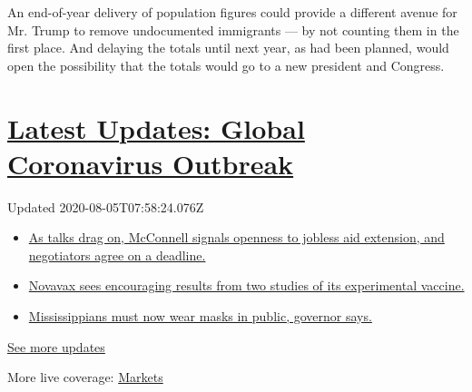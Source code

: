 An end-of-year delivery of population figures could provide a different
avenue for Mr. Trump to remove undocumented immigrants --- by not
counting them in the first place. And delaying the totals until next
year, as had been planned, would open the possibility that the totals
would go to a new president and Congress.

\hypertarget{latest-updates-global-coronavirus-outbreak}{%
\section{\texorpdfstring{\href{https://www.nytimes.com/2020/08/04/world/coronavirus-cases.html?action=click\&pgtype=Article\&state=default\&region=MAIN_CONTENT_1\&context=storylines_live_updates}{Latest
Updates: Global Coronavirus
Outbreak}}{Latest Updates: Global Coronavirus Outbreak}}\label{latest-updates-global-coronavirus-outbreak}}

Updated 2020-08-05T07:58:24.076Z

\begin{itemize}
\tightlist
\item
  \href{https://www.nytimes.com/2020/08/04/world/coronavirus-cases.html?action=click\&pgtype=Article\&state=default\&region=MAIN_CONTENT_1\&context=storylines_live_updates\#link-762df92}{As
  talks drag on, McConnell signals openness to jobless aid extension,
  and negotiators agree on a deadline.}
\item
  \href{https://www.nytimes.com/2020/08/04/world/coronavirus-cases.html?action=click\&pgtype=Article\&state=default\&region=MAIN_CONTENT_1\&context=storylines_live_updates\#link-1228a480}{Novavax
  sees encouraging results from two studies of its experimental
  vaccine.}
\item
  \href{https://www.nytimes.com/2020/08/04/world/coronavirus-cases.html?action=click\&pgtype=Article\&state=default\&region=MAIN_CONTENT_1\&context=storylines_live_updates\#link-794484ed}{Mississippians
  must now wear masks in public, governor says.}
\end{itemize}

\href{https://www.nytimes.com/2020/08/04/world/coronavirus-cases.html?action=click\&pgtype=Article\&state=default\&region=MAIN_CONTENT_1\&context=storylines_live_updates}{See
more updates}

More live coverage:
\href{https://www.nytimes.com/live/2020/08/04/business/stock-market-today-coronavirus?action=click\&pgtype=Article\&state=default\&region=MAIN_CONTENT_1\&context=storylines_live_updates}{Markets}

